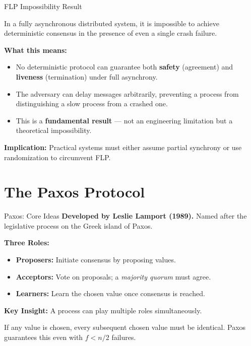 \documentclass[11pt,aspectratio=169]{beamer}
\begin{document}
\begin{frame}{FLP Impossibility Result}
\begin{tcolorbox}[thmblock,title={Theorem (Fischer--Lynch--Paterson, 1985)}]
In a fully asynchronous distributed system, it is impossible to achieve deterministic consensus in the presence of even a single crash failure.
\end{tcolorbox}

\pause

\vspace{10pt}
\textbf{What this means:}
\begin{itemize}
  \item<2-> No deterministic protocol can guarantee both \textbf{safety} (agreement) and \textbf{liveness} (termination) under full asynchrony.
  \item<3-> The adversary can delay messages arbitrarily, preventing a process from distinguishing a slow process from a crashed one.
  \item<4-> This is a \textbf{fundamental result} --- not an engineering limitation but a theoretical impossibility.
\end{itemize}

\pause

\vspace{10pt}
\textbf{Implication:} Practical systems must either assume partial synchrony or use randomization to circumvent FLP.
\end{frame}

\section{The Paxos Protocol}

\begin{frame}{Paxos: Core Ideas}
\textbf{Developed by Leslie Lamport (1989).} Named after the legislative process on the Greek island of Paxos.

\vspace{10pt}
\textbf{Three Roles:}
\begin{itemize}
  \item \textbf{Proposers:} Initiate consensus by proposing values.
  \item \textbf{Acceptors:} Vote on proposals; a \emph{majority quorum} must agree.
  \item \textbf{Learners:} Learn the chosen value once consensus is reached.
\end{itemize}

\vspace{8pt}
\textbf{Key Insight:} A process can play multiple roles simultaneously.

\vspace{8pt}
\begin{tcolorbox}[defblock,title={Safety Property}]
If any value is chosen, every subsequent chosen value must be identical. Paxos guarantees this even with $f < n/2$ failures.
\end{tcolorbox}
\end{frame}
\end{document}
